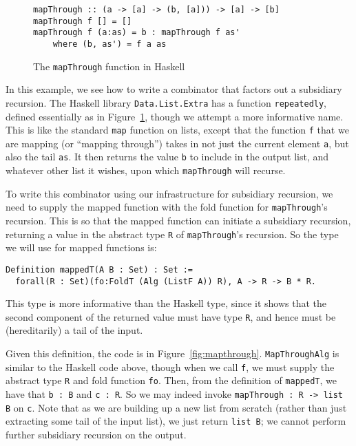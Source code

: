 \documentclass[a4paper,USenglish]{lipics-v2021}
\begin{document}
\begin{figure}
\begin{verbatim}
mapThrough :: (a -> [a] -> (b, [a])) -> [a] -> [b]
mapThrough f [] = []
mapThrough f (a:as) = b : mapThrough f as'
    where (b, as') = f a as
\end{verbatim}
\caption{The \texttt{mapThrough} function in Haskell}
\label{fig:mapthroughhs}
\end{figure}

In this example, we see how to write a combinator that factors out a
subsidiary recursion.  The Haskell library \verb|Data.List.Extra| has
a function \verb|repeatedly|, defined essentially as in
Figure~\ref{fig:mapthroughhs}, though we attempt a more informative
name.  This is like the standard \verb|map| function on lists, except
that the function \verb|f| that we are mapping (or ``mapping
through'') takes in not just the current element \verb|a|, but also
the tail \verb|as|.  It then returns the value \verb|b| to include in
the output list, and whatever other list it wishes, upon which
\verb|mapThrough| will recurse.

To write this combinator using our infrastructure for subsidiary
recursion, we need to supply the mapped function with the fold
function for \verb|mapThrough|'s recursion.  This is so that the
mapped function can initiate a subsidiary recursion, returning a value
in the abstract type \verb|R| of \verb|mapThrough|'s recursion.  So
the type we will use for mapped functions is:
\begin{verbatim}
Definition mappedT(A B : Set) : Set :=
  forall(R : Set)(fo:FoldT (Alg (ListF A)) R), A -> R -> B * R.
\end{verbatim}
\noindent This type is more informative than the Haskell type,
since it shows that the second component of the returned value
must have type \verb|R|, and hence must be (hereditarily) a tail
of the input.

Given this definition, the code is in Figure~\ref{fig:mapthrough}.  
\verb|MapThroughAlg| is similar to the
Haskell code above, though when we call \verb|f|, we must
supply the abstract type \verb|R| and fold function \verb|fo|.  Then,
from the definition of \verb|mappedT|, we have that \verb|b : B| and
\verb|c : R|.  So we may indeed invoke \verb|mapThrough : R -> list B|
on \verb|c|.  Note that as we are building up a new list from scratch
(rather than just extracting some tail of the input list), we just
return \verb|list B|; we cannot perform further subsidiary recursion
on the output.  
\end{document}
